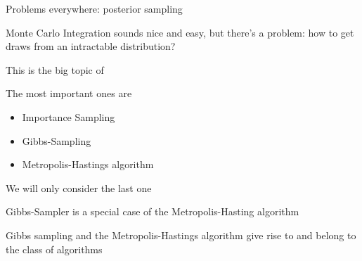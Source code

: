 
\renewcommand{\Source}{}
\begin{frame}{Problems everywhere: posterior sampling}
\begin{witemize}
    \item Monte Carlo Integration sounds nice and easy, but there's a problem: how to get draws from an intractable distribution?
    \item This is the big topic of 
    \item The most important ones are
    \begin{itemize}
      \item Importance Sampling
      \item Gibbs-Sampling \parencite{GemanGeman1984}
      \item Metropolis-Hastings algorithm \parencite{Metropolis1953,Hastings1970}
    \end{itemize}
    \item We will only consider the last one
    \item Gibbs-Sampler is a special case of the Metropolis-Hasting algorithm \parencite[see][]{Gelman1992}
    \item Gibbs sampling and the Metropolis-Hastings algorithm give rise to  and belong to the class of  algorithms
\end{witemize}
\end{frame}


